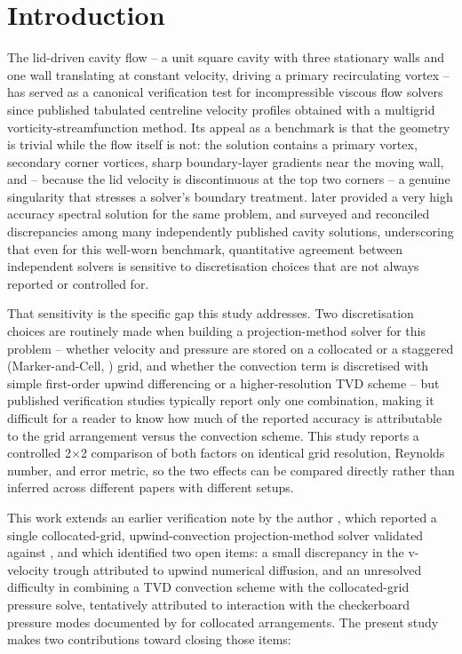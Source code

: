 \documentclass[CHICAGO]{USG}
\begin{document}
\maketitle

\section{Introduction}

The lid-driven cavity flow -- a unit square cavity with three stationary walls and one wall translating at constant velocity, driving a primary recirculating vortex -- has served as a canonical verification test for incompressible viscous flow solvers since \citet{ghia1982} published tabulated centreline velocity profiles obtained with a multigrid vorticity-streamfunction method. Its appeal as a benchmark is that the geometry is trivial while the flow itself is not: the solution contains a primary vortex, secondary corner vortices, sharp boundary-layer gradients near the moving wall, and -- because the lid velocity is discontinuous at the top two corners -- a genuine singularity that stresses a solver's boundary treatment. \citet{botella1998} later provided a very high accuracy spectral solution for the same problem, and \citet{erturk2009} surveyed and reconciled discrepancies among many independently published cavity solutions, underscoring that even for this well-worn benchmark, quantitative agreement between independent solvers is sensitive to discretisation choices that are not always reported or controlled for.

That sensitivity is the specific gap this study addresses. Two discretisation choices are routinely made when building a projection-method solver for this problem -- whether velocity and pressure are stored on a collocated or a staggered (Marker-and-Cell, \citealp{harlow1965}) grid, and whether the convection term is discretised with simple first-order upwind differencing or a higher-resolution TVD scheme -- but published verification studies typically report only one combination, making it difficult for a reader to know how much of the reported accuracy is attributable to the grid arrangement versus the convection scheme. This study reports a controlled 2$\times$2 comparison of both factors on identical grid resolution, Reynolds number, and error metric, so the two effects can be compared directly rather than inferred across different papers with different setups.

This work extends an earlier verification note by the author \citep{rajaramaduraikarthik2026}, which reported a single collocated-grid, upwind-convection projection-method solver validated against \citet{ghia1982}, and which identified two open items: a small discrepancy in the v-velocity trough attributed to upwind numerical diffusion, and an unresolved difficulty in combining a TVD convection scheme with the collocated-grid pressure solve, tentatively attributed to interaction with the checkerboard pressure modes documented by \citet{rhie1983} for collocated arrangements. The present study makes two contributions toward closing those items:
\end{document}
